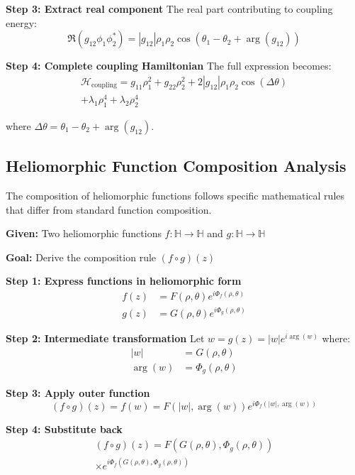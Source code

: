 \textbf{Step 3: Extract real component}
The real part contributing to coupling energy:
\begin{equation}
\Re(g_{12}\phi_1\phi_2^*) = |g_{12}|\rho_1\rho_2\cos(\theta_1-\theta_2+\arg(g_{12}))
\end{equation}

\textbf{Step 4: Complete coupling Hamiltonian}
The full expression becomes:
\begin{multline}
\mathcal{H}_{\text{coupling}} = g_{11}\rho_1^2 + g_{22}\rho_2^2 + 2|g_{12}|\rho_1\rho_2\cos(\Delta\theta) \\
+ \lambda_1\rho_1^4 + \lambda_2\rho_2^4
\end{multline}

where $\Delta\theta = \theta_1-\theta_2+\arg(g_{12})$.

\subsection{Heliomorphic Function Composition Analysis}

The composition of heliomorphic functions follows specific mathematical rules that differ from standard function composition.

\textbf{Given:} Two heliomorphic functions $f: \mathbb{H} \rightarrow \mathbb{H}$ and $g: \mathbb{H} \rightarrow \mathbb{H}$

\textbf{Goal:} Derive the composition rule $(f \circ g)(z)$

\textbf{Step 1: Express functions in heliomorphic form}
\begin{align}
f(z) &= F(\rho, \theta) e^{i\Phi_f(\rho, \theta)} \\
g(z) &= G(\rho, \theta) e^{i\Phi_g(\rho, \theta)}
\end{align}

\textbf{Step 2: Intermediate transformation}
Let $w = g(z) = |w|e^{i\arg(w)}$ where:
\begin{align}
|w| &= G(\rho, \theta) \\
\arg(w) &= \Phi_g(\rho, \theta)
\end{align}

\textbf{Step 3: Apply outer function}
\begin{equation}
(f \circ g)(z) = f(w) = F(|w|, \arg(w)) e^{i\Phi_f(|w|, \arg(w))}
\end{equation}

\textbf{Step 4: Substitute back}
\begin{multline}
(f \circ g)(z) = F(G(\rho, \theta), \Phi_g(\rho, \theta)) \\
\times e^{i\Phi_f(G(\rho, \theta), \Phi_g(\rho, \theta))}
\end{multline}

